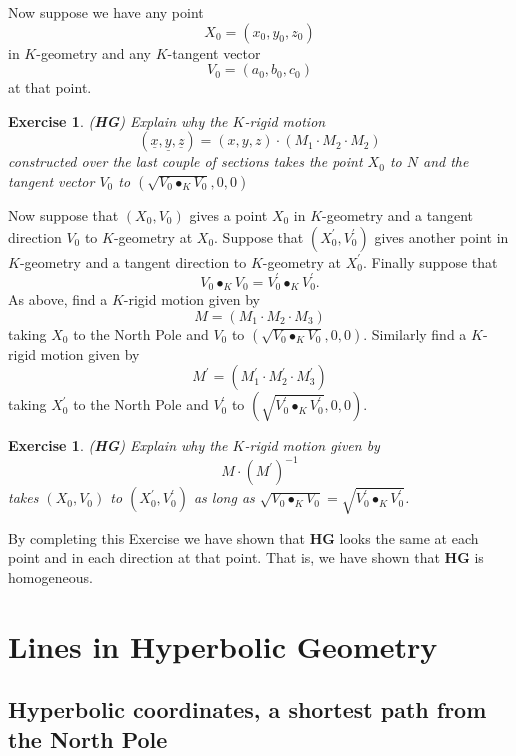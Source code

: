 \documentclass{article}%
\newtheorem{exercise}[theorem]{Exercise}
\begin{document}
Now suppose we have any point%
\[
X_{0}=\left(  x_{0},y_{0},z_{0}\right)
\]
in $K$-geometry and any $K$-tangent vector%
\[
V_{0}=\left(  a_{0},b_{0},c_{0}\right)
\]
at that point.

\begin{exercise}
(\textbf{HG}) Explain why the $K$-rigid motion%
\[
\left(  \underline{x},\underline{y},\underline{z}\right)  =\left(
x,y,z\right)  \cdot\left(  M_{1}\cdot M_{2}\cdot M_{2}\right)
\]
constructed over the last couple of sections takes the point $X_{0}$ to $N$
and the tangent vector $V_{0}$ to $\left(  \sqrt{V_{0}\bullet_{K}V_{0}%
},0,0\right)  $
\end{exercise}

Now suppose that $\left(  X_{0},V_{0}\right)  $ gives a point $X_{0}$ in
$K$-geometry and a tangent direction $V_{0}$ to $K$-geometry at $X_{0}$.
Suppose that $\left(  X_{0}^{\prime},V_{0}^{\prime}\right)  $ gives another
point in $K$-geometry and a tangent direction to $K$-geometry at
$X_{0}^{\prime}$. Finally suppose that%
\[
V_{0}\bullet_{K}V_{0}=V_{0}^{\prime}\bullet_{K}V_{0}^{\prime}.
\]
As above, find a $K$-rigid motion given by%
\[
M=\left(  M_{1}\cdot M_{2}\cdot M_{3}\right)
\]
taking $X_{0}$ to the North Pole and $V_{0}$ to $\left(  \sqrt{V_{0}%
\bullet_{K}V_{0}},0,0\right)  $. Similarly find a $K$-rigid motion given by%
\[
M^{\prime}=\left(  M_{1}^{\prime}\cdot M_{2}^{\prime}\cdot M_{3}^{\prime
}\right)
\]
taking $X_{0}^{\prime}$ to the North Pole and $V_{0}^{\prime}$ to $\left(
\sqrt{V_{0}^{\prime}\bullet_{K}V_{0}^{\prime}},0,0\right)  .$

\begin{exercise}
(\textbf{HG}) Explain why the $K$-rigid motion given by%
\[
M\cdot\left(  M^{\prime}\right)  ^{-1}%
\]
takes $\left(  X_{0},V_{0}\right)  $ to $\left(  X_{0}^{\prime},V_{0}^{\prime
}\right)  $ as long as $\sqrt{V_{0}\bullet_{K}V_{0}}=\sqrt{V_{0}^{\prime
}\bullet_{K}V_{0}^{\prime}}$.
\end{exercise}

By completing this Exercise we have shown that \textbf{HG} looks the same at
each point and in each direction at that point. That is, we have shown that
\textbf{HG} is homogeneous.\pagebreak

\section{Lines in Hyperbolic Geometry}

\subsection{Hyperbolic coordinates, a shortest path from the North Pole}
\end{document}
